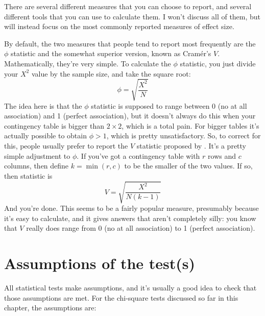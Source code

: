 There are several different measures that you can choose to report, and several different tools that you can use to calculate them. I won't discuss all of them, but will instead focus on the most commonly reported measures of effect size. 

By default, the two measures that people tend to report most frequently are the $\phi$ statistic and the somewhat superior version, known as  Cram\'er's $V$. Mathematically, they're very simple. To calculate the $\phi$ statistic, you just divide your $X^2$ value by the sample size, and take the square root:
$$ 
\phi = \sqrt{\frac{X^2}{N}}
$$
The idea here is that the $\phi$ statistic is supposed to range between 0 (no at all association) and 1 (perfect association), but it doesn't always do this when your contingency table is bigger than $2 \times 2$, which is a total pain. For bigger tables it's actually possible to obtain $\phi>1$, which is pretty unsatisfactory. So, to correct for this, people usually prefer to report the $V$ statistic proposed by \textcite{Cramer1946}. It's a pretty simple adjustment to $\phi$. If you've got a contingency table with $r$ rows and $c$ columns, then define $k = \min(r,c)$ to be the smaller of the two values. If so, then  statistic is
$$
V = \sqrt{\frac{X^2}{N(k-1)}}
$$
And you're done. This seems to be a fairly popular measure, presumably because it's easy to calculate, and it gives answers that aren't completely silly: you know that $V$ really does range from 0 (no at all association) to 1 (perfect association). 


\section{Assumptions of the test(s)~\label{sec:chisqassumptions}}

All statistical tests make assumptions, and it's usually a good idea to check that those assumptions are met. For the chi-square tests discussed so far in this chapter, the assumptions are:

